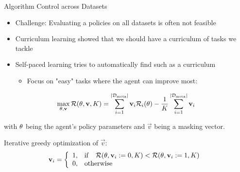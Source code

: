 \begin{frame}[c]{Algorithm Control across Datasets }
	
\begin{itemize}
	\item Challenge: Evaluating a policies on all datasets is often not feasible
	\pause
	\item Curriculum learning  showed that we should have a curriculum of tasks we tackle
	\pause
	\item Self-paced learning  tries to automatically find such as a curriculum
	\begin{itemize}
		\item Focus on "easy" tasks where the agent can improve most:
	\end{itemize}
\end{itemize}
	
\pause
\begin{equation} 
\label{spl_loss}
\max_{\theta,\mathbf{v}}\mathcal{R}(\theta, \mathbf{v}, K) = \sum^{|\mathcal{D}_{\text{meta}}|}_{i=1} \mathbf{v}_i\mathcal{R}_i(\theta) - \frac{1}{K} \sum^{|\mathcal{D}_{\text{meta}}|}_{i=1} \mathbf{v}_i \nonumber
\end{equation}

with $\theta$ being the agent's policy parameters and $\vec{v}$ being a masking vector.

\pause
\medskip

Iterative greedy optimization of $\vec{v}$:
\begin{equation}
\mathbf{v}_i = \left\{
\begin{array}{ll}
1, &  \mathrm{if}\quad\mathcal{R}(\theta, \mathbf{v}_{i}:=0, K) < \mathcal{R}(\theta, \mathbf{v}_{i}:=1, K)\\
0, & \mathrm{otherwise}
\end{array}
\right.\nonumber
\end{equation}
\end{frame}


